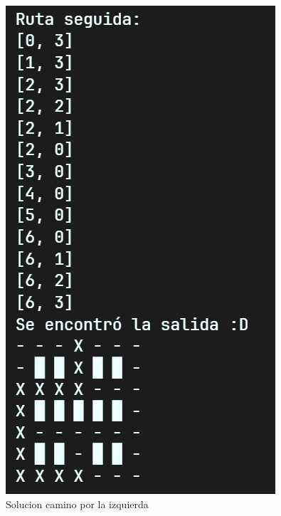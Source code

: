 \begin{figure}[H]
    \centering
    \begin{minipage}[b]{0.2\textwidth}
      \includegraphics[width=\textwidth]{IMA/RLaberinto2_1.png}
      \caption{Solucion camino por la izquierda}
    \end{minipage}
    \hfill
    \begin{minipage}[b]{0.2\textwidth}

\end{minipage}
\end{figure}
